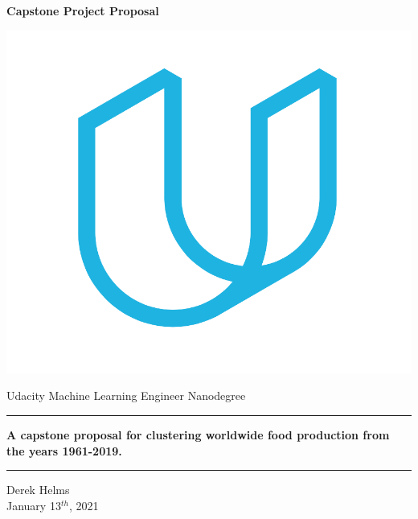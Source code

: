 \documentclass[12pt, a4paper]{article}
\begin{document}
\begin{spacing}{1.1}

	\begin{titlepage}
	\begin{center}
		\vspace*{1.4cm}
		
		\Huge \textbf{Capstone Project Proposal}
		
		\vspace*{1cm}
		
		\includegraphics[scale=.5]{logo}
		
		\vspace*{1cm}
		
		\LARGE {Udacity Machine Learning Engineer Nanodegree}
		
		\vspace*{1cm}
		
		\hrule \vspace*{.5cm}
		
		\Large \textbf{A capstone proposal for clustering worldwide food production from the years 1961-2019.}
		
		\vspace*{.5cm} \hrule
		
		\vspace*{1cm}
		
		\Large Derek Helms \\
		\Large January 13$^{th}$, 2021
	\end{center}
	\end{titlepage} \newpage


\end{spacing}
\end{document}
